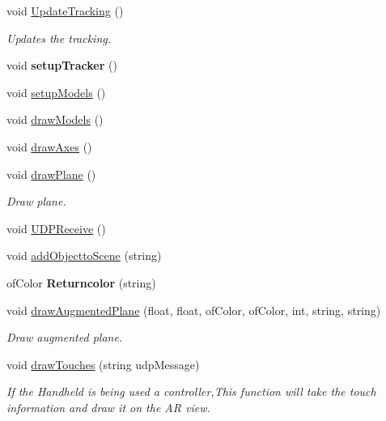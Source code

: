 \begin{DoxyCompactItemize}
\item 
void \hyperlink{classtest_app_a853bbabdab3e7d2f207bb5a2028990bd}{Update\-Tracking} ()
\begin{DoxyCompactList}\small\item\em Updates the tracking. \end{DoxyCompactList}\item 
\hypertarget{classtest_app_a6a4db7a6a914fc4899763fc94bfca4b7}{void {\bfseries setup\-Tracker} ()}\label{classtest_app_a6a4db7a6a914fc4899763fc94bfca4b7}

\item 
void \hyperlink{classtest_app_af88f7715b2e0a9692b4ec947fad63c31}{setup\-Models} ()
\item 
void \hyperlink{classtest_app_a78bdea262a12308cb6f9f9243bdb3db9}{draw\-Models} ()
\item 
void \hyperlink{group___int_variables_gaa2fcbae31171ba366d4c0fcaf44149f4}{draw\-Axes} ()
\item 
void \hyperlink{group___int_variables_ga47747729f6d0d84c36ef0ec9fca01303}{draw\-Plane} ()
\begin{DoxyCompactList}\small\item\em Draw plane. \end{DoxyCompactList}\item 
void \hyperlink{group___int_variables_gae18e12d5025a2167ebd63ca019468cc0}{U\-D\-P\-Receive} ()
\item 
void \hyperlink{group___int_variables_gaa1d58aa9130d8d7526eb407f13f7a833}{add\-Objectto\-Scene} (string)
\item 
\hypertarget{group___int_variables_ga689f3b0cf0b38217152da7f5ce0d609f}{of\-Color {\bfseries Returncolor} (string)}\label{group___int_variables_ga689f3b0cf0b38217152da7f5ce0d609f}

\item 
void \hyperlink{group___int_variables_ga34646de458b0af33bc02457c9b8583df}{draw\-Augmented\-Plane} (float, float, of\-Color, of\-Color, int, string, string)
\begin{DoxyCompactList}\small\item\em Draw augmented plane. \end{DoxyCompactList}\item 
void \hyperlink{group___int_variables_ga16036c3aa23c1747e315a3e18105cf45}{draw\-Touches} (string udp\-Message)
\begin{DoxyCompactList}\small\item\em If the Handheld is being used a controller,This function will take the touch information and draw it on the A\-R view. \end{DoxyCompactList}\end{DoxyCompactItemize}
